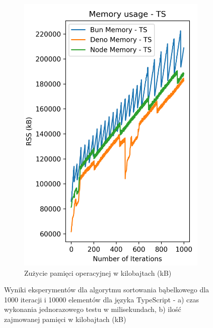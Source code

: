 \begin{figure}[H]
\begin{subfigure}[b]{0.42\textwidth}
    \label{fig:bubble_sorting_e4_ts_time}
  \end{subfigure}
  \begin{subfigure}[b]{0.42\textwidth}
    \centering
    \includegraphics[width=\textwidth]{Figures/sorting/sorting_bubble_1000_10000_ts_memory.png}
    \caption{Zużycie pamięci operacyjnej w kilobajtach (kB)}
    \label{fig:bubble_sorting_e4_ts_memory}
  \end{subfigure}
  \caption{Wyniki eksperymentów dla algorytmu sortowania bąbelkowego dla 1000 iteracji i 10000 elementów dla języka TypeScript - a) czas wykonania jednorazowego testu w milisekundach, b) ilość zajmowanej pamięci w kilobajtach (kB)}
  \label{fig:bubble_sorting_e4_ts}
\end{figure}

